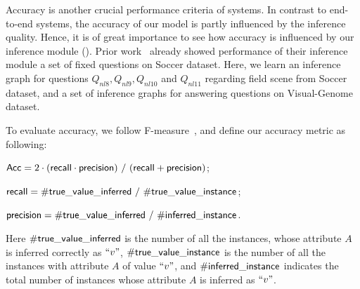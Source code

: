 Accuracy is another crucial performance criteria of \vqa systems. In contrast to end-to-end systems, the accuracy of our model is partly influenced by the inference quality. Hence, it is of great importance to see how accuracy is influenced by our inference module (). Prior work~\cite{peixi2019} already showed performance of their inference module \wrt a set of fixed questions on Soccer dataset. Here, we learn an inference graph for questions $Q_{nl8},Q_{nl9},Q_{nl10}$ and $Q_{nl11}$ regarding field scene from Soccer dataset, and a set of inference graphs for answering questions on Visual-Genome dataset. 

To evaluate accuracy, we follow F-measure~\cite{Fmeasure}, and define our accuracy metric as following:


\noindent ${\mathsf{Acc}}=2\cdot ({\mathsf{recall}}\cdot {\ensuremath {\mathsf{precision}}})~/~({\mathsf{recall}}+{\mathsf{precision}})$;

\noindent ${\mathsf{recall}}=\#{\mathsf{true}}\_{\mathsf{value}}\_{\mathsf{inferred}}~/~\#{\mathsf{true}}\_{\mathsf{value}}\_{\mathsf{instance}}$;

\noindent ${\mathsf{precision}}=\#{\mathsf{true}}\_{\mathsf{value}}\_{\mathsf{inferred}}~/~\#{\mathsf{inferred}}\_{\mathsf{instance}}$.


Here $\#{\mathsf{true}}\_{\mathsf{value}}\_{\mathsf{inferred}}$ is the number of all the instances, whose attribute $A$ is inferred correctly as $``v"$,  $\#{\mathsf{true}}\_{\mathsf{value}}\_{\mathsf{instance}}$ is the number of all the instances with attribute $A$ of value $``v"$, and $\#{\mathsf{inferred}}\_{\mathsf{instance}}$ indicates the total number of instances whose attribute $A$ is inferred as $``v"$. 




